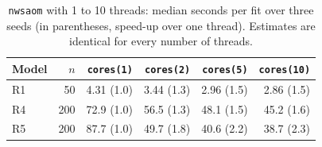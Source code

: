 \begin{table}[htbp]
\centering
\caption{\texttt{nwsaom} with 1 to 10 threads: median seconds per fit over three seeds
(in parentheses, speed-up over one thread). Estimates are identical for every number of threads.}
\label{tab:cores}
\footnotesize
\begin{tabular}{lrrrrr}
\toprule
Model & $n$ & \texttt{cores(1)} & \texttt{cores(2)} & \texttt{cores(5)} & \texttt{cores(10)} \\
\midrule
R1 & 50 & 4.31 (1.0) & 3.44 (1.3) & 2.96 (1.5) & 2.86 (1.5) \\
R4 & 200 & 72.9 (1.0) & 56.5 (1.3) & 48.1 (1.5) & 45.2 (1.6) \\
R5 & 200 & 87.7 (1.0) & 49.7 (1.8) & 40.6 (2.2) & 38.7 (2.3) \\
\bottomrule
\end{tabular}
\end{table}
